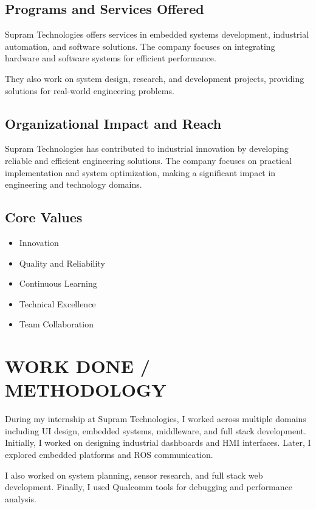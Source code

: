 \documentclass[12pt,a4paper]{report}
\begin{document}
\section{Programs and Services Offered}
Supram Technologies offers services in embedded systems development, industrial automation, and software solutions. The company focuses on integrating hardware and software systems for efficient performance.

They also work on system design, research, and development projects, providing solutions for real-world engineering problems.

\section{Organizational Impact and Reach}
Supram Technologies has contributed to industrial innovation by developing reliable and efficient engineering solutions. The company focuses on practical implementation and system optimization, making a significant impact in engineering and technology domains.

\section{Core Values}
\begin{itemize}[leftmargin=1.5em]
    \item Innovation
    \item Quality and Reliability
    \item Continuous Learning
    \item Technical Excellence
    \item Team Collaboration
\end{itemize}



\chapter{WORK DONE / METHODOLOGY}

During my internship at Supram Technologies, I worked across multiple domains including UI design, embedded systems, middleware, and full stack development. Initially, I worked on designing industrial dashboards and HMI interfaces. Later, I explored embedded platforms and ROS communication.

I also worked on system planning, sensor research, and full stack web development. Finally, I used Qualcomm tools for debugging and performance analysis.
\end{document}
